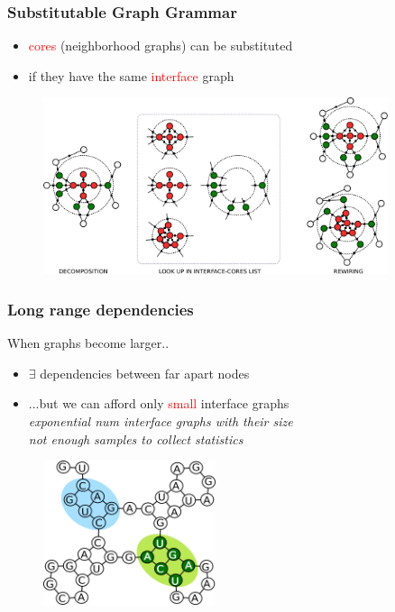 \documentclass{beamer}
\newcommand{\red}[1]{\textcolor{red}{#1}}
\begin{document}
\begin{frame}
    \frametitle{Substitutable Graph Grammar}
    \begin{itemize}
        \item \red{cores} (neighborhood graphs) can be substituted  
        \item if they have the same \red{interface} graph
    \end{itemize}
    \begin{figure}[ht]
        \centering
        \includegraphics[width=0.9\textwidth]{images/cip.pdf}
    \end{figure}
\end{frame}




\begin{frame}
    \frametitle{Long range dependencies}
    When graphs become larger..
    \begin{itemize}
        \item $\exists$ dependencies between far apart nodes 
        \item ...but we can afford only \red{small} interface graphs  \\
        {\em exponential num interface graphs with their size} \\
        {\em not enough samples to collect statistics}
    \end{itemize}
   \begin{figure}[h!]
        \centering
        \includegraphics[width=0.45\textwidth]{images/longrangedep.png}
    \end{figure}
    
\end{frame}
\end{document}
